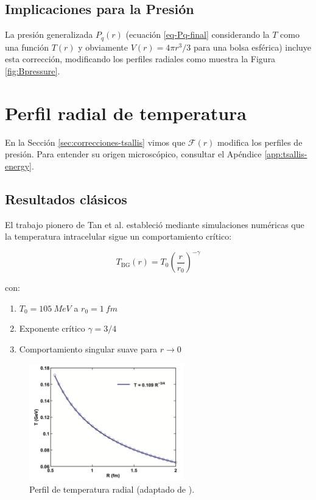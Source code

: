 \subsection{Implicaciones para la Presión}
La presión generalizada $P_q(r)$ (ecuación \eqref{eq-Pq-final} considerando la $T$ como una función $T(r)$ y obviamente $V (r)= 4 \pi {r}^{3} / 3$ para una bolsa esférica) incluye esta corrección, modificando los perfiles radiales como muestra la Figura \ref{fig:Bpressure}.

\section{Perfil radial de temperatura}
En la Sección \ref{sec:correcciones-tsallis} vimos que $\mathcal{F}(r)$ modifica los perfiles de presión. Para entender su origen microscópico, consultar el Apéndice \ref{app:tsallis-energy}.

\subsection{Resultados clásicos}
El trabajo pionero de Tan et al. \cite{tan2019} estableció mediante simulaciones numéricas que la temperatura intracelular sigue un comportamiento crítico:

\begin{equation} \label{eq-Tclassic}
T_{\text{BG}}(r) = T_0\left(\frac{r}{r_0}\right)^{-\gamma}
\end{equation}

con:

\begin{enumerate}[ a) ]
    \item $T_0 = \qty{105}{MeV}$ a $r_0 = \qty{1}{fm}$
    \item Exponente crítico $\gamma = 3/4$
    \item Comportamiento singular suave para $r \to 0$
\end{enumerate}

\begin{figure}[h]
    \centering
    \includegraphics[width=0.6\textwidth]{./Images/T(R).png}
    \caption{Perfil de temperatura radial (adaptado de \cite{tan2019}).} %
    \label{fig:Tprofile}
\end{figure}

